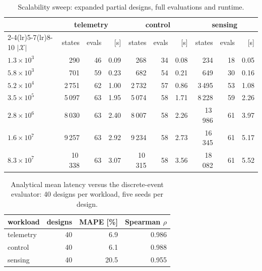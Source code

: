 \documentclass[pdflatex,sn-nature]{sn-jnl}
\theoremstyle{thmstyleone}
\theoremstyle{thmstyletwo}
\theoremstyle{thmstylethree}
\begin{document}
\begin{table}[!htbp]\centering
\caption{Scalability sweep: expanded partial designs, full evaluations and
runtime.}\label{tabS12}
{\let\scriptsize\tiny\setlength{\tabcolsep}{2pt}\scriptsize
\setlength{\tabcolsep}{3.5pt}
\begin{tabular}{lrrrrrrrrr}
\toprule
& \multicolumn{3}{c}{telemetry} & \multicolumn{3}{c}{control} & \multicolumn{3}{c}{sensing} \\
\cmidrule(lr){2-4}\cmidrule(lr){5-7}\cmidrule(lr){8-10}
$|\mathcal{X}|$ & states & evals & [s] & states & evals & [s] & states & evals & [s] \\
\midrule
${1.3\times 10^{3}}$ & 290 & 46 & 0.09 & 268 & 34 & 0.08 & 234 & 18 & 0.05 \\
${5.8\times 10^{3}}$ & 701 & 59 & 0.23 & 682 & 54 & 0.21 & 649 & 30 & 0.16 \\
${5.2\times 10^{4}}$ & 2\,751 & 62 & 1.00 & 2\,732 & 57 & 0.86 & 3\,495 & 53 & 1.08 \\
${3.5\times 10^{5}}$ & 5\,097 & 63 & 1.95 & 5\,074 & 58 & 1.71 & 8\,228 & 59 & 2.26 \\
${2.8\times 10^{6}}$ & 8\,030 & 63 & 2.40 & 8\,007 & 58 & 2.26 & 13\,986 & 61 & 3.97 \\
${1.6\times 10^{7}}$ & 9\,257 & 63 & 2.92 & 9\,234 & 58 & 2.73 & 16\,345 & 61 & 5.17 \\
${8.3\times 10^{7}}$ & 10\,338 & 63 & 3.07 & 10\,315 & 58 & 3.56 & 18\,082 & 61 & 5.52 \\
\bottomrule
\end{tabular}}
\end{table}

\begin{table}[!htbp]\centering
\caption{Analytical mean latency versus the discrete-event evaluator: 40 designs per
workload, five seeds per design.}\label{tabS13}
{\let\scriptsize\tiny\setlength{\tabcolsep}{2pt}\scriptsize
\begin{tabular}{lrrr}
\toprule
workload & designs & MAPE [\%] & Spearman $\rho$ \\
\midrule
telemetry & 40 & 6.9 & 0.986 \\
control & 40 & 6.1 & 0.988 \\
sensing & 40 & 20.5 & 0.955 \\
\bottomrule
\end{tabular}}
\end{table}
\end{document}
